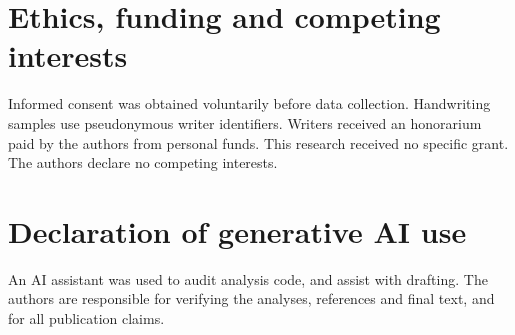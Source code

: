 \documentclass[5p,times,twocolumn,final,numbers,sort&compress]{elsarticle}
\begin{document}
\section*{Ethics, funding and competing interests}
Informed consent was obtained voluntarily before data collection. Handwriting samples use pseudonymous writer identifiers. Writers received an honorarium paid by the authors from personal funds. This research received no specific grant. The authors declare no competing interests.

\section*{Declaration of generative AI use}
An AI assistant was used to audit analysis code, and assist with drafting. The authors are responsible for verifying the analyses, references and final text, and for all publication claims.



\end{document}
